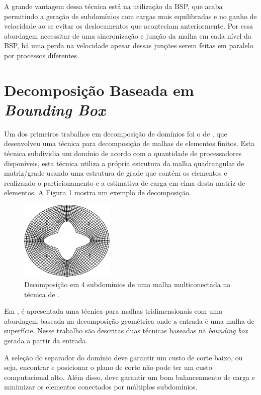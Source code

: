     
A grande vantagem dessa técnica está na utilização da BSP, que acaba permitindo a geração de subdomínios com cargas mais equilibradas e no ganho de velocidade ao se evitar os deslocamentos que aconteciam anteriormente. Por essa abordagem necessitar de uma sincronização e junção da malha em cada nível da BSP, há uma perda na velocidade apesar dessas junções serem feitas em paralelo por processos diferentes.


 \section{Decomposição Baseada em \textit{Bounding Box}}

Um dos primeiros trabalhos em decomposição de domínios foi o de \cite{bib:FARHAT88}, que desenvolveu uma técnica para decomposição de malhas de elementos finitos. Esta técnica subdividia um domínio de acordo com a quantidade de processadores disponíveis, esta técnica utiliza a própria estrutura da malha quadrangular de matriz/grade usando uma estrutura de grade que contém os elementos e realizando o particionamento e a estimativa de carga em cima desta matriz de elementos. A Figura \ref{fig:farhat} mostra um exemplo de decomposição.


 \begin{figure}[htbp]
     \centering
     \includegraphics[width=0.4\textwidth]{fig/farhat.png}
     \caption{Decomposição em 4 subdomínios de uma malha multiconectada na técnica de \cite{bib:FARHAT88}.}
     \label{fig:farhat}
 \end{figure}


Em \cite{bib:Glut08}, é apresentada uma técnica para malhas tridimensionais com uma abordagem baseada na decomposição geométrica onde a entrada é uma malha de superfície. Nesse trabalho são descritas duas técnicas baseadas na \textit{bounding box} gerada a partir da entrada.

A seleção do separador do domínio deve garantir um custo de corte baixo, ou seja, encontrar e posicionar o plano de corte não pode ter um custo computacional alto. Além disso, deve garantir um bom balanceamento de carga e minimizar os elementos conectados por múltiplos subdomínios.

